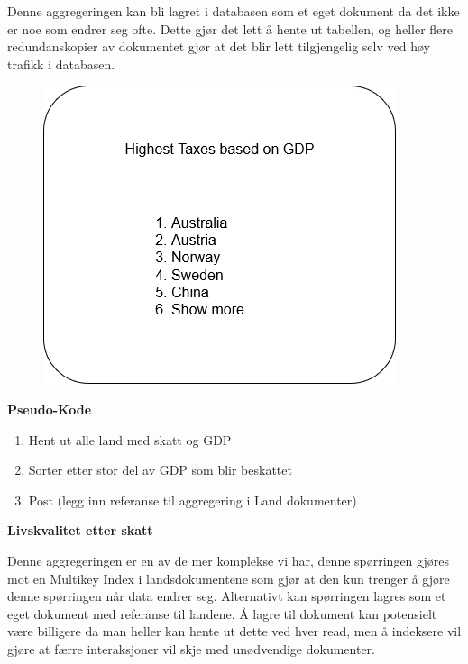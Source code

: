 Denne aggregeringen kan bli lagret i databasen som et eget dokument da det ikke er noe som endrer seg ofte. Dette gjør det lett å hente ut tabellen, og heller flere redundanskopier av dokumentet gjør at det blir lett tilgjengelig selv ved høy trafikk i databasen.

\FigureCounter
\begin{figure}[H]
  \includegraphics[scale=1]{images/milepael3/highestTaxesByGDP.png}
\end{figure}

\textbf{Pseudo-Kode}
\begin{enumerate}
  \item Hent ut alle land med skatt og GDP
  \item Sorter etter stor del av GDP som blir beskattet
  \item Post (legg inn referanse til aggregering i Land dokumenter)
\end{enumerate}

\textbf{Livskvalitet etter skatt}

Denne aggregeringen er en av de mer komplekse vi har, denne spørringen gjøres mot en Multikey Index i landsdokumentene som gjør at den kun trenger å gjøre denne spørringen når data endrer seg. Alternativt kan spørringen lagres som et eget dokument med referanse til landene. Å lagre til dokument kan potensielt være billigere da man heller kan hente ut dette ved hver read, men å indeksere vil gjøre at færre interaksjoner vil skje med unødvendige dokumenter.

